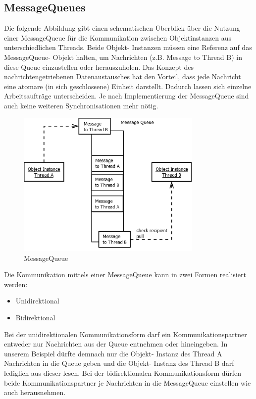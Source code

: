 \documentclass[12pt,oneside,a4paper,bibtotoc,liststotoc]{scrreprt}
\begin{document}
\subsection{MessageQueues}
Die folgende Abbildung gibt einen schematischen Überblick über die Nutzung einer MessageQueue für die Kommunikation zwischen Objektinstanzen aus unterschiedlichen Threads. Beide Objekt- Instanzen müssen eine Referenz auf das MessageQueue- Objekt halten, um Nachrichten (z.B. Message to Thread B) in diese Queue einzustellen oder herauszuholen. Das Konzept des nachrichtengetriebenen Datenaustausches hat den Vorteil, dass jede Nachricht eine atomare (in sich geschlossene) Einheit darstellt. Dadurch lassen sich einzelne Arbeitsaufträge unterscheiden. Je nach Implementierung der MessageQueue sind auch keine weiteren Synchronisationen mehr nötig.
\begin{figure}[H]
  \begin{centering}
    \includegraphics[width=0.8\textwidth]{img/MessageQueue.png}
    \caption{MessageQueue}
    \label{MessageQueue}
  \end{centering}
\end{figure}
Die Kommunikation mittels einer MessageQueue kann in zwei Formen realisiert werden:
\begin{itemize}
\item Unidirektional
\item Bidirektional
\end{itemize}
Bei der unidirektionalen Kommunikationsform darf ein Kommunikationspartner entweder nur Nachrichten aus der Queue entnehmen oder hineingeben. In unserem Beispiel dürfte demnach nur die Objekt- Instanz des Thread A Nachrichten in die Queue geben und die Objekt- Instanz des Thread B darf lediglich aus dieser lesen.\newline
Bei der bidirektionalen Kommunikationsform dürfen beide Kommunikationspartner je Nachrichten in die MessageQueue einstellen wie auch herausnehmen.\newline 
\newline
\end{document}
